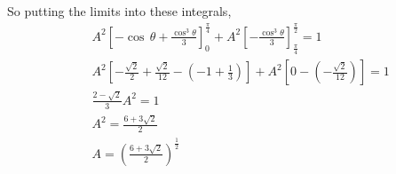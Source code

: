\documentclass{article}
\begin{document}
{So putting the limits into these integrals,
\begin{eqnarray*}
 &&A^2 [-\cos\,\theta + \frac{\cos^3\theta}{3}]_{0}^{\frac{\pi}{4}} + A^2[-\frac{\cos^3\theta}{3}]_{\frac{\pi}{4}}^{\frac{\pi}{2}} = 1\\
 &&A^2[-\frac{\sqrt{2}}{2}+\frac{\sqrt{2}}{12}-(-1+\frac{1}{3})] + A^2[0-(-\frac{\sqrt{2}}{12})] = 1\\
 &&\frac{2-\sqrt{2}}{3} A^2 = 1\\
 &&A^2 = \frac{6 + 3\sqrt{2}}{2}\\
 && A = (\frac{6 + 3\sqrt{2}}{2})^\frac{1}{2}
\end{eqnarray*}
}

\subsection{}%
\end{document}
